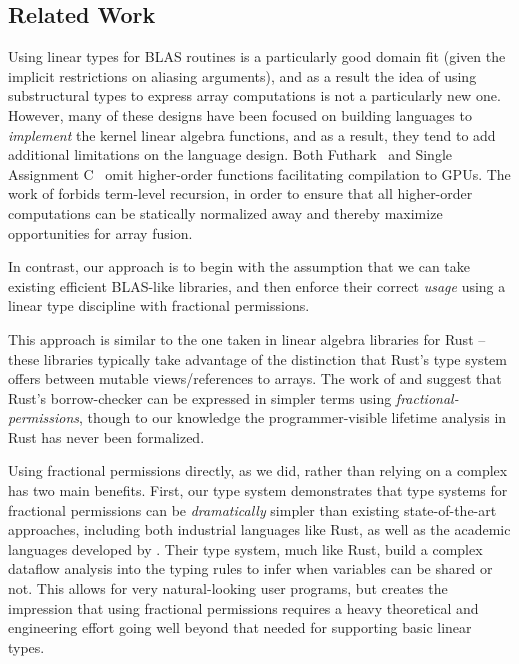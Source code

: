 \subsection{Related Work}

Using linear types for BLAS routines is a particularly good domain fit
(given the implicit restrictions on aliasing arguments), and as a
result the idea of using substructural types to express array
computations is not a particularly new
one\cite{scholz,henriksen,bernardy2016}.  However, many of these
designs have been focused on building languages to \emph{implement}
the kernel linear algebra functions, and as a result, they tend to add
additional limitations on the language design. Both
Futhark~\cite{henriksen} and Single Assignment C~\cite{scholz} omit
higher-order functions facilitating compilation to GPUs. The work of
\cite{bernardy2016} forbids term-level recursion, in order to ensure
that all higher-order computations can be statically normalized away
and thereby maximize opportunities for array fusion.

In contrast, our approach is to begin with the assumption that we can
take existing efficient BLAS-like libraries, and then enforce their
correct \emph{usage} using a linear type discipline with fractional
permissions. 


This approach is similar to the one taken in linear algebra libraries
for Rust -- these libraries typically take advantage of the
distinction that Rust's type system offers between mutable
views/references to arrays.  The work of \cite{weiss} and
\cite{rustbelt} suggest that Rust's borrow-checker can be expressed
in simpler terms using \emph{fractional-permissions}, though to our
knowledge the programmer-visible lifetime analysis in Rust has never
been formalized.

Using fractional permissions directly, as we did, rather than relying
on a complex has two main benefits. First, our type system
demonstrates that type systems for fractional permissions can be
\emph{dramatically} simpler than existing state-of-the-art approaches,
including both industrial languages like Rust, as well as the academic
languages developed by \cite{bierhoff}.  Their type system, much like
Rust, build a complex dataflow analysis into the typing rules to infer
when variables can be shared or not. This allows for very
natural-looking user programs, but creates the impression that using
fractional permissions requires a heavy theoretical and engineering
effort going well beyond that needed for supporting basic linear
types.

